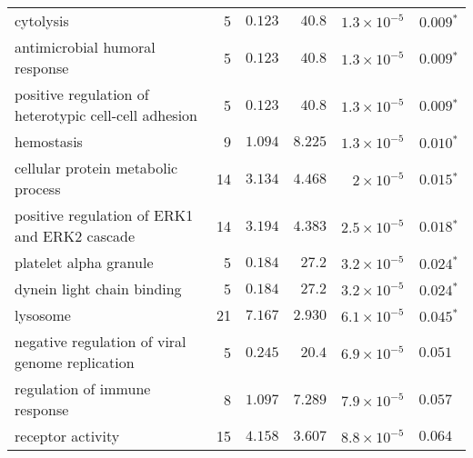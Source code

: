 \begin{longtable}{|l|r|r|r|r|r|}
    cytolysis                                             & 5                       & $ 0.123$                & $  40.8$     & $1.3\times 10^{-5}$  & $\bm{ 0.009{^*}}$               \\
    antimicrobial humoral response                        & 5                       & $ 0.123$                & $  40.8$     & $1.3\times 10^{-5}$  & $\bm{ 0.009{^*}}$               \\
    positive regulation of heterotypic cell-cell adhesion & 5                       & $ 0.123$                & $  40.8$     & $1.3\times 10^{-5}$ & $\bm{ 0.009{^*}}$ \\
    hemostasis                                            & 9                       & $ 1.094$                & $ 8.225$   & $1.3\times 10^{-5}$  & $\bm{ 0.010{^*}}$               \\
    cellular protein metabolic process                    & 14                      & $ 3.134$                & $ 4.468$   & $ 2\times 10^{-5}$   & $\bm{ 0.015{^*}}$               \\
    positive regulation of ERK1 and ERK2 cascade          & 14                      & $ 3.194$                & $ 4.383$   & $2.5\times 10^{-5}$ & $\bm{ 0.018{^*}}$ \\
    platelet alpha granule                                & 5                       & $ 0.184$                & $  27.2$     & $3.2\times 10^{-5}$  & $\bm{ 0.024{^*}}$               \\
    dynein light chain binding                            & 5                       & $ 0.184$                & $  27.2$     & $3.2\times 10^{-5}$  & $\bm{ 0.024{^*}}$               \\
    lysosome                                              & 21                      & $ 7.167$                & $ 2.930$   & $6.1\times 10^{-5}$  & $\bm{ 0.045{^*}}$               \\
    negative regulation of viral genome replication       & 5                       & $ 0.245$                & $  20.4$     & $6.9\times 10^{-5}$ & $ 0.051~~$ \\
    regulation of immune response                         & 8                       & $ 1.097$                & $ 7.289$   & $7.9\times 10^{-5}$  & $ 0.057~~$                      \\
    receptor activity                                     & 15                      & $ 4.158$                & $ 3.607$   & $8.8\times 10^{-5}$  & $ 0.064~~$                      \\

\end{longtable}
